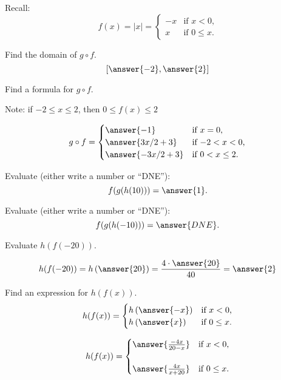 \documentclass{ximera}
\begin{document}
Recall: 
 \[
   f(x) = |x| =
    \begin{cases}
    -x & \text{if $x<0$,}\\
       x & \text{if $0\le x$.}
    \end{cases}
    \]

\begin{exercise}
  Find the domain of $g\circ f$.
  \[
  \left[\answer{-2},\answer{2}\right]
  \]
  \begin{exercise}
    Find a formula for $g\circ f$.
    \begin{hint}
    Note: if $-2\le x\le2$,  then $0\le f(x)\le2$
    \end{hint}
    \[
    g\circ f =
  \begin{cases}
    \answer{-1} & \text{if $x=0$,}\\
    \answer{3x/2 + 3} &\text{if $-2<x<0$,}\\
    \answer{-3x/2 + 3}&\text{if $0<x\le 2$.}
  \end{cases}
  \]
  \end{exercise}
\end{exercise}
\begin{exercise}
  Evaluate (either write a number or ``DNE''):
  \[
  f(g(h(10))) = \answer{1}.
  \]
\end{exercise}
\begin{exercise}
  Evaluate (either write a number or ``DNE''):
  \[
  f(g(h(-10))) = \answer{DNE}.
  \]
\end{exercise}
\begin{exercise}
  Evaluate $h(f(-20))$.


    \[
    h(f(-20)) =h\left(\answer{20} \right)=\frac{4\cdot\answer{20}}{40}=\answer{2}
    \]
  \end{exercise}
\begin{exercise}
  Find an expression for $h(f(x))$.
  \[
    h(f(x)) =
    \begin{cases}
     h\left( \answer{-x}\right) & \text{if $x<0$,}\\
       h\left( \answer{x}\right) & \text{if $0\le x$.}
    \end{cases}
    \]

    \[
    h(f(x)) =
    \begin{cases}
      \answer{\frac{-4x}{20-x}} & \text{if $x<0$,}\\
      \\
      
      \answer{\frac{4x}{x+20}}  & \text{if $0\le x$.}
    \end{cases}
    \]
  \end{exercise}
\end{document}
